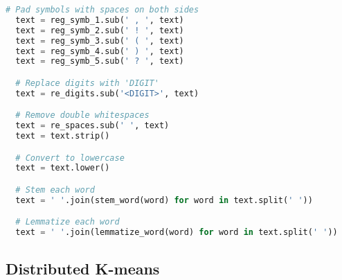 \begin{lstlisting}[language=python]
  # Pad symbols with spaces on both sides
  text = reg_symb_1.sub(' , ', text)
  text = reg_symb_2.sub(' ! ', text)
  text = reg_symb_3.sub(' ( ', text)
  text = reg_symb_4.sub(' ) ', text)
  text = reg_symb_5.sub(' ? ', text)

  # Replace digits with 'DIGIT'
  text = re_digits.sub('<DIGIT>', text)

  # Remove double whitespaces
  text = re_spaces.sub(' ', text)
  text = text.strip()

  # Convert to lowercase
  text = text.lower()

  # Stem each word
  text = ' '.join(stem_word(word) for word in text.split(' '))

  # Lemmatize each word
  text = ' '.join(lemmatize_word(word) for word in text.split(' '))
\end{lstlisting}


\subsection{Distributed K-means}
\label{app:k-means}

